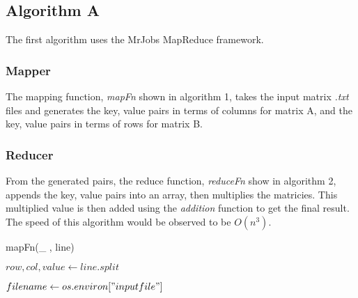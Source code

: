 \documentclass[twocolumn]{IEEEtran}
\begin{document}
	\subsection{Algorithm A}
	The first algorithm uses the MrJobs MapReduce framework.
	\subsubsection{Mapper}
	 The mapping function, \textit{mapFn} shown in algorithm 1, takes the input matrix \textit{.txt} files and generates the key, value pairs in terms of columns for matrix A, and the key, value pairs in terms of rows for matrix B.\\
	
	\subsubsection{Reducer}
	 From the generated pairs, the reduce function, \textit{reduceFn} show in algorithm 2, appends the key, value pairs into an array, then multiplies the matricies. This multiplied value  is then added using the \textit{addition} function to get the final result. The speed of this algorithm would be observed to be $O(n^{3})$.
		
		\begin{algorithm}
			\caption{mapFn(\_ , line)}
			\begin{algorithmic} 
		
				\STATE $row, col, value \leftarrow line.split$
				
				\STATE$filename \leftarrow os.environ["input file"] $
				
				\ENDIF
				
			\end{algorithmic}
		\end{algorithm}
		
		
		
		

		
		
		
		
\end{document}

